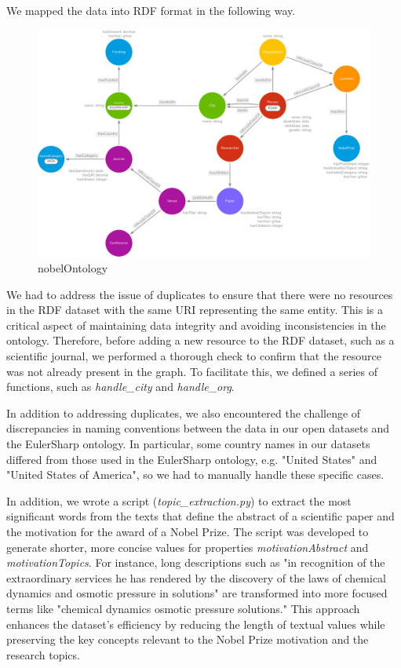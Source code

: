 \documentclass{article}
\begin{document}
\noindent We mapped the data into RDF format in the following way.

\begin{figure}[ht]
    \centering
    \includegraphics[width=\textwidth]{nobelOntologyTransparent.png}
    \caption{nobelOntology}
    \label{fig:nobelOntology}
\end{figure}

\newpage

\noindent We had to address the issue of duplicates to ensure that there were no resources in the RDF dataset with the same URI representing the same
entity. This is a critical aspect of maintaining data integrity and avoiding inconsistencies in the ontology. Therefore, before adding a new resource to
the RDF dataset, such as a scientific journal, we performed a thorough check to confirm that the resource was not already present in the graph.
To facilitate this, we defined a series of functions, such as \textit{handle\_city} and \textit{handle\_org}.

\noindent In addition to addressing duplicates, we also encountered the challenge of discrepancies in naming conventions between the data in our open
datasets and the EulerSharp ontology. In particular, some country names in our datasets differed from those used in the EulerSharp ontology, e.g. "United
States" and "United States of America", so we had to manually handle these specific cases.

\noindent In addition, we wrote a script (\textit{topic\_extraction.py}) to extract the most significant words from the texts that define the abstract of a
scientific paper and the motivation for the award of a Nobel Prize. The script was developed to generate shorter, more concise values for properties
\textit{motivationAbstract} and \textit{motivationTopics}. For instance, long descriptions such as "in recognition of the extraordinary services he has rendered by the
discovery of the laws of chemical dynamics and osmotic pressure in solutions" are transformed into more focused terms like "chemical dynamics osmotic
pressure solutions." This approach enhances the dataset's efficiency by reducing the length of textual values while preserving the key concepts relevant
to the Nobel Prize motivation and the research topics.
\end{document}
